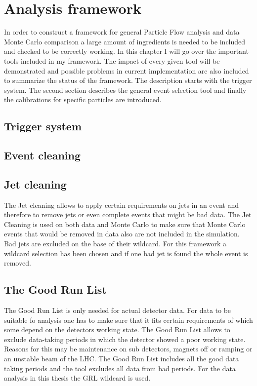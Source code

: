 \chapter{Analysis framework}

In order to construct a framework for general Particle Flow analysis and data Monte Carlo comparison a large amount of ingredients is needed to be included and checked to be correctly working. In this chapter I will go over the important tools included in my framework. The impact of every given tool will be demonstrated and possible problems in current implementation are also included to summarize the status of the framework.
The description starts with the trigger system. The second section describes the general event selection tool and finally the calibrations for specific particles are introduced.


\section{Trigger system}

\section{Event cleaning}

\section{Jet cleaning}

The Jet cleaning allows to apply certain requirements on jets in an event and therefore to remove jets or even complete events that might be bad data. The Jet Cleaning is used on both data and Monte Carlo to make sure that Monte Carlo events that would be removed in data also are not included in the simulation.
Bad jets are excluded on the base of their wildcard.
For this framework a wildcard selection has been chosen and if one bad jet is found the whole event is removed.

\section{The Good Run List}

The Good Run List is only needed for actual detector data. For data to be suitable fo analysis one has to make sure that it fits certain requirements of which some depend on the detectors working state. The Good Run List allows to exclude data-taking periods in which the detector showed a poor working state. Reasons for this may be maintenance on sub detectors, magnets off or ramping or an unstable beam of the LHC.
The Good Run List includes all the good data taking periods and the tool excludes all data from bad periods.
For the data analysis in this thesis the GRL wildcard is used.

